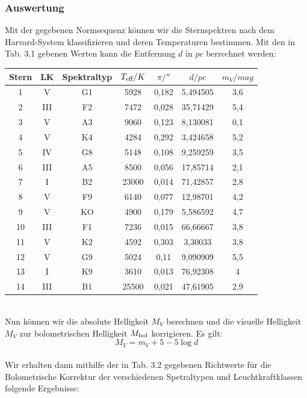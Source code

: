 \documentclass[12pt]{article}
\begin{document}
\subsubsection*{Auswertung}
Mit der gegebenen Normsequenz können wir die Sternspektren nach dem Harvard-System klassifizieren und deren Temperaturen bestimmen. Mit den in Tab. 3.1 gebenen Werten kann die Entfernung $d$ in $pc$ berrechnet werden:
\begin{table}[!ht]
    \centering
    \begin{tabular}{c|c|c|c|c|c|c}
        Stern & LK & Spektraltyp & $T_{\textnormal{eff}}/K$ & $\pi / ''$ & $d/pc$ & $m_V/mag$ \\ \hline
        1 & V & G1 & 5928 & 0,182 & 5,494505 & 3,6 \\ 
        2 & III & F2 & 7472 & 0,028 & 35,71429 & 5,4 \\ 
        3 & V & A3 & 9060 & 0,123 & 8,130081 & 0,1 \\
        4 & V & K4 & 4284 & 0,292 & 3,424658 & 5,2 \\ 
        5 & IV & G8 & 5148 & 0,108 & 9,259259 & 3,5 \\ 
        6 & III & A5 & 8500 & 0,056 & 17,85714 & 2,1 \\ 
        7 & I & B2 & 23000 & 0,014 & 71,42857 & 2,8 \\ 
        8 & V & F9 & 6140 & 0,077 & 12,98701 & 4,2 \\ 
        9 & V & KO & 4900 & 0,179 & 5,586592 & 4,7 \\ 
        10 & III & F1 & 7236 & 0,015 & 66,66667 & 3,8 \\ 
        11 & V & K2 & 4592 & 0,303 & 3,30033 & 3,8 \\ 
        12 & V & G9 & 5024 & 0,11 & 9,090909 & 5,5 \\ 
        13 & I & K9 & 3610 & 0,013 & 76,92308 & 4 \\ 
        14 & III & B1 & 25500 & 0,021 & 47,61905 & 2,9 \\ 
    \end{tabular}
\end{table} \\
Nun können wir die absolute Helligkeit $M_V$ berechnen und die visuelle Helligkeit $M_V$ zur bolometrischen Helligkeit $M_{\textnormal{bol}}$ korrigieren. Es gilt:\\
\[M_V = m_V + 5 - 5\log d\] \\
Wir erhalten dann mithilfe der in Tab. 3.2 gegebenen Richtwerte für die Bolometrische Korrektur der verschiedenen Spetraltypen und Leuchtkraftklassen folgende Ergebnisse:\\
\end{document}
